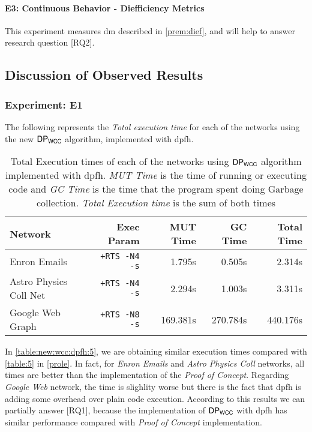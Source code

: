 \paragraph{E3: Continuous Behavior - Diefficiency Metrics}
This experiment measures \acrlong{dm} described in \autoref{prem:dief}, and will help to answer research question [RQ2].

\subsection{Discussion of Observed Results}\label{new:experiments}
\subsubsection{Experiment: E1}\label{sub:new:sec:e1}
The following represents the \emph{Total execution time} for each of the networks using the new $\mathsf{DP_{WCC}}$ algorithm, implemented with \acrshort{dpfh}.
 
\begin{table}[H]
  \centering
  \begin{tabular}{|l|r|r|r|r|}
   \hline
   \textbf{Network} & \textbf{Exec Param} & \textbf{MUT Time} & \textbf{GC Time} & \textbf{Total Time}\\
   \hline
   Enron Emails & \texttt{+RTS -N4 -s} & 1.795s & 0.505s & 2.314s \\
   \hline
   Astro Physics Coll Net & \texttt{+RTS -N4 -s} & 2.294s & 1.003s & 3.311s \\
   \hline
   Google Web Graph & \texttt{+RTS -N8 -s} & 169.381s & 270.784s & 440.176s \\
   \hline
  \end{tabular}
 \caption{Total Execution times of each of the networks using $\mathsf{DP_{WCC}}$ algorithm implemented with \acrshort{dpfh}. \textit{MUT Time} is the time of running or executing code and \textit{GC Time} is the time that the program spent doing Garbage collection. \textit{Total Execution time} is the sum of both times}
 \label{table:new:wcc:dpfh:5}
 \end{table}

In \autoref{table:new:wcc:dpfh:5}, we are obtaining similar execution times compared with \autoref{table:5} in \autoref{prole}.
In fact, for \textit{Enron Emails} and \textit{Astro Physics Coll} networks, all times are better than the implementation of the \textit{Proof of Concept}.
Regarding \textit{Google Web} network, the time is slighlity worse but there is the fact that \acrshort{dpfh} is adding some overhead over plain code execution.
According to this results we can partially answer [RQ1], because the implementation of $\mathsf{DP_{WCC}}$ with \acrshort{dpfh} has similar performance compared with \textit{Proof of Concept} implementation. 

